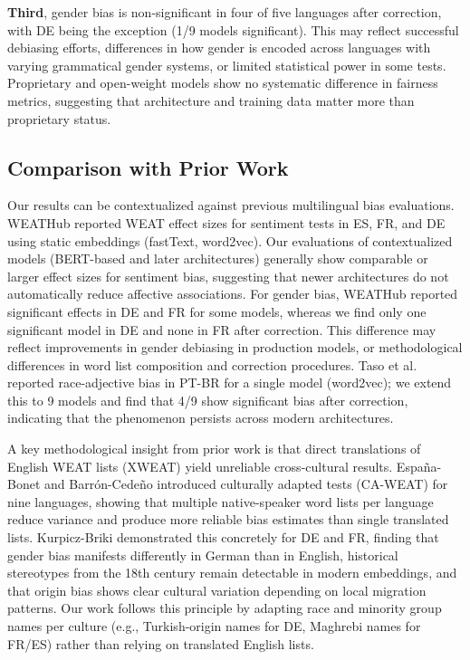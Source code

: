 \documentclass{sbc2019}
\begin{document}
\textbf{Third}, gender bias is non-significant in four of five languages after correction, with DE being the exception (1/9 models significant). This may reflect successful debiasing efforts, differences in how gender is encoded across languages with varying grammatical gender systems, or limited statistical power in some tests. Proprietary and open-weight models show no systematic difference in fairness metrics, suggesting that architecture and training data matter more than proprietary status.

\subsection{Comparison with Prior Work}

Our results can be contextualized against previous multilingual bias evaluations. WEATHub \cite{mukherjee2023weathub} reported WEAT effect sizes for sentiment tests in ES, FR, and DE using static embeddings (fastText, word2vec). Our evaluations of contextualized models (BERT-based and later architectures) generally show comparable or larger effect sizes for sentiment bias, suggesting that newer architectures do not automatically reduce affective associations. For gender bias, WEATHub reported significant effects in DE and FR for some models, whereas we find only one significant model in DE and none in FR after correction. This difference may reflect improvements in gender debiasing in production models, or methodological differences in word list composition and correction procedures. Taso et al. \cite{taso2023sexismo} reported race-adjective bias in PT-BR for a single model (word2vec); we extend this to 9 models and find that 4/9 show significant bias after correction, indicating that the phenomenon persists across modern architectures.

A key methodological insight from prior work is that direct translations of English WEAT lists (XWEAT) yield unreliable cross-cultural results. Espa\~{n}a-Bonet and Barr\'{o}n-Cede\~{n}o \cite{espana2022attenuation} introduced culturally adapted tests (CA-WEAT) for nine languages, showing that multiple native-speaker word lists per language reduce variance and produce more reliable bias estimates than single translated lists. Kurpicz-Briki \cite{kurpiczbriki2020cultural} demonstrated this concretely for DE and FR, finding that gender bias manifests differently in German than in English, historical stereotypes from the 18th century remain detectable in modern embeddings, and that origin bias shows clear cultural variation depending on local migration patterns. Our work follows this principle by adapting race and minority group names per culture (e.g., Turkish-origin names for DE, Maghrebi names for FR/ES) rather than relying on translated English lists.
\end{document}
